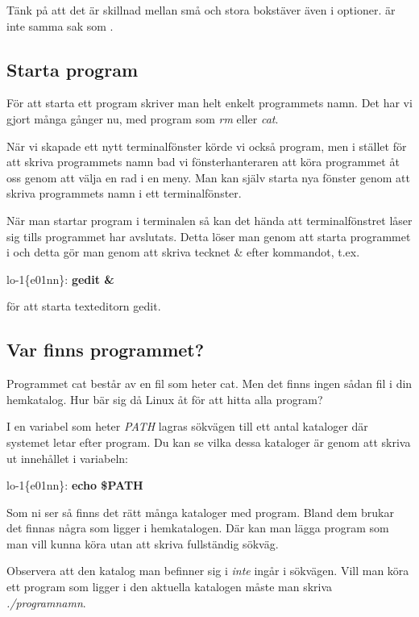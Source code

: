 \documentclass[a4paper,twocolumn]{book}
\begin{document}
Tänk på att det är skillnad mellan små och stora bokstäver även i
optioner.  är inte samma sak som .

\subsection{Starta program}

För att starta ett program skriver man helt enkelt programmets
namn. Det har vi gjort många gånger nu, med program som \emph{rm}
eller \emph{cat}.

När vi skapade ett nytt terminalfönster körde vi också program,
men i stället för att skriva programmets namn bad vi fönsterhanteraren
att köra programmet åt oss genom att välja en rad i en meny.
Man kan själv starta nya fönster genom att skriva programmets namn i
ett terminalfönster.

När man startar program i terminalen så kan det hända att terminalfönstret låser sig
tills programmet har avslutats. Detta löser man genom att starta programmet i
 och detta gör man genom att skriva tecknet \& efter
kommandot, t.ex.
\begin{example}
  lo-1\{e01nn\}: \textbf{gedit &}
\end{example}
för att starta texteditorn gedit.

\subsection{Var finns programmet?}

Programmet cat består av en fil som heter cat. Men det finns ingen
sådan fil i din hemkatalog. Hur bär sig då Linux åt för att hitta
alla program?

I en variabel som heter \emph{PATH} lagras sökvägen till
ett antal kataloger där systemet letar efter program. Du kan se vilka dessa kataloger är genom att skriva ut innehållet i variabeln:

\begin{example}
  lo-1\{e01nn\}: \textbf{echo \$PATH}
\end{example}


Som ni ser så finns det rätt många kataloger med program. Bland dem
brukar det finnas några som ligger i hemkatalogen. Där kan man lägga program som
man vill kunna köra utan att skriva fullständig sökväg.

Observera att den katalog man befinner sig i \emph{inte} ingår i
sökvägen. Vill man köra ett program  som ligger i den
aktuella katalogen måste man skriva \emph{./programnamn}.
\end{document}
